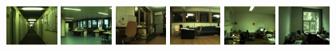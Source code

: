 
\begin{figure}
\begin{center}
\includegraphics[width=0.15\textwidth]{figures/cold/Saarbruecken_CR.jpg}
\includegraphics[width=0.15\textwidth]{figures/cold/Saarbruecken_TR.jpg}
\includegraphics[width=0.15\textwidth]{figures/cold/Freiburg_PA.jpg}
\includegraphics[width=0.15\textwidth]{figures/cold/Freiburg_LO.jpg}
\includegraphics[width=0.15\textwidth]{figures/cold/Ljubljana_LAB.jpg}
\includegraphics[width=0.15\textwidth]{figures/cold/Ljubljana_2PO.jpg}


\end{center}
\end{figure}
